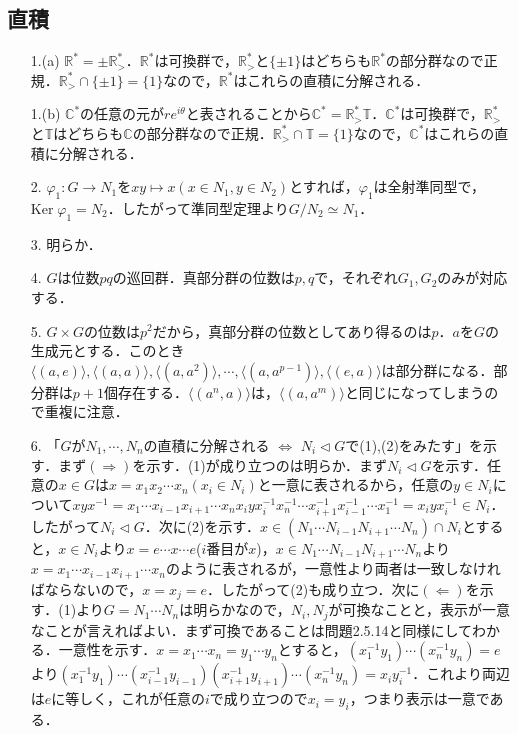 \documentclass[a4paper,10pt,uplatex]{jsarticle}
\newcommand{\Set}[1]{\{#1\}}
\newcommand{\R}{\mathbb{R}}
\newcommand{\C}{\mathbb{C}}
\newcommand{\T}{\mathbb{T}}
\newcommand{\Ker}{\text{Ker}\;}
\numberwithin{equation}{section}
\theoremstyle{mystyle}
\begin{document}
\subsection{直積}
\begin{itemize}
    \item[1.(a)] $\R^* = \pm\R_>^*$．$\R^*$は可換群で，$\R_>^*$と$\Set{\pm 1}$はどちらも$\R^*$の部分群なので正規．$\R_>^* \cap \Set{\pm 1} = \Set{1}$なので，$\R^*$はこれらの直積に分解される．
    \item[1.(b)] $\C^*$の任意の元が$re^{i\theta}$と表されることから$\C^* = \R_>^*\T$．$\C^*$は可換群で，$\R_>^*$と$\T$はどちらも$\C$の部分群なので正規．$\R_>^* \cap \T = \{1\}$なので，$\C^*$はこれらの直積に分解される．
    \item[2.] $\varphi_1:G \to N_1$を$xy \mapsto x(x \in N_1, y \in N_2)$とすれば，$\varphi_1$は全射準同型で，$\Ker \varphi_1 = N_2$．したがって準同型定理より$G/N_2 \simeq N_1$．
    \item[3.] 明らか．
    \item[4.] $G$は位数$pq$の巡回群．真部分群の位数は$p,q$で，それぞれ$G_1,G_2$のみが対応する．
    \item[5.] $G \times G$の位数は$p^2$だから，真部分群の位数としてあり得るのは$p$．$a$を$G$の生成元とする．このとき$\langle(a,e)\rangle,\langle(a,a)\rangle,\langle(a,a^2)\rangle,\cdots,\langle(a,a^{p-1})\rangle,\langle(e,a)\rangle$は部分群になる．部分群は$p+1$個存在する．$\langle(a^n, a)\rangle$は，$\langle(a,a^m)\rangle$と同じになってしまうので重複に注意．
    \item[6.] 「$G$が$N_1,\cdots,N_n$の直積に分解される $\Leftrightarrow$ $N_i \triangleleft G$で(1),(2)をみたす」を示す．まず$(\Rightarrow)$を示す．(1)が成り立つのは明らか．まず$N_i \triangleleft G$を示す．任意の$x \in G$は$x = x_1x_2 \cdots x_n(x_i \in N_i)$と一意に表されるから，任意の$y \in N_i$について$xyx^{-1} = x_1 \cdots x_{i-1}x_{i+1} \cdots x_n x_i y x_i^{-1} x_n^{-1} \cdots x_{i+1}^{-1}x_{i-1}^{-1} \cdots x_1^{-1} = x_i y x_i^{-1} \in N_i$．したがって$N_i \triangleleft G$．次に(2)を示す．$x \in (N_1 \cdots N_{i-1}N_{i+1} \cdots N_n) \cap N_i$とすると，$x \in N_i$より$x = e \cdots x \cdots e$($i$番目が$x$)，$x \in N_1 \cdots N_{i-1}N_{i+1} \cdots N_n$より$x = x_1 \cdots x_{i-1} x_{i+1} \cdots x_n$のように表されるが，一意性より両者は一致しなければならないので，$x = x_j = e$．したがって(2)も成り立つ．次に$(\Leftarrow)$を示す．(1)より$G=N_1 \cdots N_n$は明らかなので，$N_i,N_j$が可換なことと，表示が一意なことが言えればよい．まず可換であることは問題2.5.14と同様にしてわかる．一意性を示す．$x = x_1 \cdots x_n = y_1 \cdots y_n$とすると，$(x_1^{-1}y_1) \cdots (x_n^{-1}y_n) = e$より$(x_1^{-1}y_1) \cdots (x_{i-1}^{-1}y_{i-1})(x_{i+1}^{-1}y_{i+1}) \cdots (x_n^{-1}y_n) = x_iy_i^{-1}$．これより両辺は$e$に等しく，これが任意の$i$で成り立つので$x_i = y_i$，つまり表示は一意である．
\end{itemize}
\end{document}
